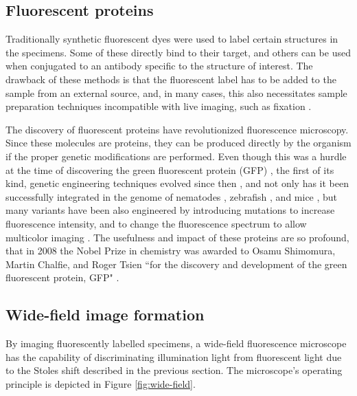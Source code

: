 

  \subsection{Fluorescent proteins}
    Traditionally synthetic fluorescent dyes were used to label certain structures in the specimens. Some of these directly bind to their target,
    and others can be used when conjugated to an antibody specific to the structure of interest. The drawback of these methods is that the fluorescent label has to be added to the sample from an external source, and, in many cases, this also necessitates sample preparation techniques incompatible with live imaging, such as fixation \cite{bacallao_guiding_1990}.

    The discovery of fluorescent proteins have revolutionized fluorescence microscopy. Since these molecules are proteins, they can be produced directly by the organism if the proper genetic modifications are performed. Even though this was a hurdle at the time of discovering the green fluorescent protein (GFP) \cite{shimomura_extraction_1962}, the first of its kind, genetic engineering techniques evolved since then \cite{prasher_primary_1992}, and not only has it been successfully integrated in the genome of nematodes \cite{chalfie_green_1994}, zebrafish \cite{amsterdam_aequorea_1995}, and mice \cite{okabe_green_1997}, but many variants have been also engineered by introducing mutations to increase fluorescence intensity, and to change the fluorescence spectrum to allow multicolor imaging \cite{heim_wavelength_1994,heim_engineering_1996,cormack_facs-optimized_1996,okabe_green_1997}. The usefulness and impact of these proteins are so profound, that in 2008 the Nobel Prize in chemistry was awarded to Osamu Shimomura, Martin Chalfie, and Roger Tsien ``for the discovery and development of the green fluorescent protein, GFP" \cite{service_three_2008}.


  \subsection{Wide-field image formation}
    By imaging fluorescently labelled specimens, a wide-field fluorescence microscope has the capability of discriminating illumination light from fluorescent light due to the Stoles shift described in the previous section. The microscope's operating principle is depicted in Figure \ref{fig:wide-field}.

